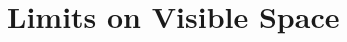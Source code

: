 \documentclass{article}
\numberwithin{equation}{section}
\begin{document}
\section{Limits on Visible Space}
\end{document}
